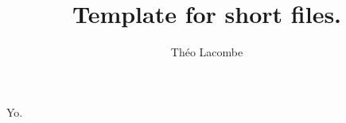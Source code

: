 \documentclass[11pt]{article}
\title{Template for short files.}
\author{Théo Lacombe}
\date{}
\begin{document}
\maketitle

Yo.
\end{document}

